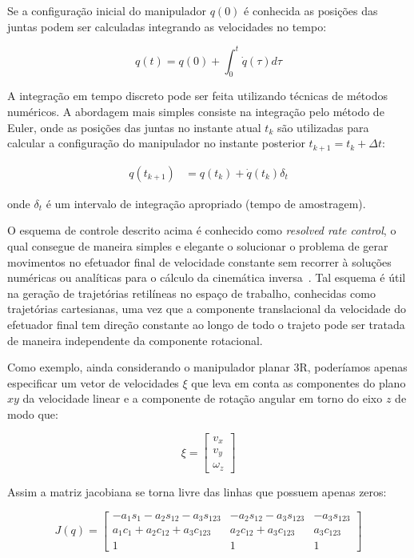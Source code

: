 Se a configuração inicial do manipulador \(q(0)\) é conhecida as posições das
juntas podem ser calculadas integrando as velocidades no tempo:

\begin{equation}
    q(t) = q(0) + \int_{0}^{t} \dot{q}(\tau) d\tau
\end{equation}

A integração em tempo discreto pode ser feita utilizando técnicas de métodos
numéricos. A abordagem mais simples consiste na integração pelo método de
Euler, onde as posições das juntas no instante atual \(t_k\) são utilizadas
para calcular a configuração do manipulador no instante posterior \(t_{k+1} =
t_k + \Delta t\):

\begin{align}
    q(t_{k + 1}) & = q(t_k) + \dot{q}(t_k) \delta_t
\end{align}

onde \(\delta_t\) é um intervalo de integração apropriado (tempo de
amostragem).

O esquema de controle descrito acima é conhecido como \emph{resolved rate
    control}, o qual consegue de maneira simples e elegante o solucionar o problema
de gerar movimentos no efetuador final de velocidade constante sem recorrer à
soluções numéricas ou analíticas para o cálculo da cinemática inversa~\cite{corke_robotics_2023}. 
Tal esquema é útil na geração de trajetórias retilíneas no espaço de trabalho,
conhecidas como trajetórias cartesianas, uma vez que a componente translacional
da velocidade do efetuador final tem direção constante ao longo de todo o
trajeto pode ser tratada de maneira independente da componente rotacional.

Como exemplo, ainda considerando o manipulador planar 3R, poderíamos apenas
especificar um vetor de velocidades \(\xi\) que leva em conta as componentes do
plano \(xy\) da velocidade linear e a componente de rotação angular em torno do
eixo \(z\) de modo que:

\begin{equation}
    \xi = \begin{bmatrix}
        v_x \\
        v_y \\
        \omega_z
    \end{bmatrix}
\end{equation}

Assim a matriz jacobiana se torna livre das linhas que possuem apenas zeros:

\begin{equation}
    J(q) = \begin{bmatrix}
        -a_1 s_1 - a_2 s_{12} - a_3 s_{123} & -a_2 s_{12} - a_3 s_{123} & -a_3 s_{123} \\
        a_1 c_1 + a_2 c_{12} + a_3 c_{123}  & a_2 c_{12} + a_3 c_{123}  & a_3 c_{123}  \\
        1                                   & 1                         & 1
    \end{bmatrix}
\end{equation}


